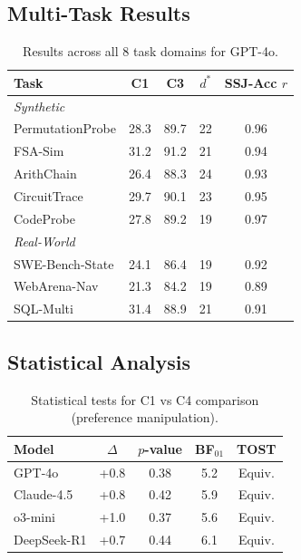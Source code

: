 \documentclass{article}
\theoremstyle{plain}
\theoremstyle{definition}
\theoremstyle{remark}
\begin{document}
\subsection{Multi-Task Results}

\begin{table}[h]
\centering
\caption{Results across all 8 task domains for GPT-4o.}
\label{tab:multitask}
\small
\begin{tabular}{@{}lcccc@{}}
\toprule
\textbf{Task} & \textbf{C1} & \textbf{C3} & \textbf{$d^*$} & \textbf{SSJ-Acc $r$} \\
\midrule
\multicolumn{5}{l}{\textit{Synthetic}} \\
PermutationProbe & 28.3 & 89.7 & 22 & 0.96 \\
FSA-Sim & 31.2 & 91.2 & 21 & 0.94 \\
ArithChain & 26.4 & 88.3 & 24 & 0.93 \\
CircuitTrace & 29.7 & 90.1 & 23 & 0.95 \\
CodeProbe & 27.8 & 89.2 & 19 & 0.97 \\
\midrule
\multicolumn{5}{l}{\textit{Real-World}} \\
SWE-Bench-State & 24.1 & 86.4 & 19 & 0.92 \\
WebArena-Nav & 21.3 & 84.2 & 19 & 0.89 \\
SQL-Multi & 31.4 & 88.9 & 21 & 0.91 \\
\bottomrule
\end{tabular}
\end{table}

\subsection{Statistical Analysis}

\begin{table}[h]
\centering
\caption{Statistical tests for C1 vs C4 comparison (preference manipulation).}
\label{tab:stats}
\small
\begin{tabular}{@{}lcccc@{}}
\toprule
\textbf{Model} & \textbf{$\Delta$} & \textbf{$p$-value} & \textbf{BF$_{01}$} & \textbf{TOST} \\
\midrule
GPT-4o & +0.8 & 0.38 & 5.2 & Equiv. \\
Claude-4.5 & +0.8 & 0.42 & 5.9 & Equiv. \\
o3-mini & +1.0 & 0.37 & 5.6 & Equiv. \\
DeepSeek-R1 & +0.7 & 0.44 & 6.1 & Equiv. \\
\bottomrule
\end{tabular}
\end{table}
\end{document}
